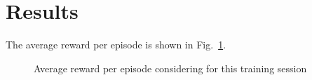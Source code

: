 \documentclass{IEEEtran}
\begin{document}
\section{Results}
The average reward per episode is shown in Fig.~\ref{fig:results}.
\begin{figure}[t!]
    \resizebox{\columnwidth}{!}{}
    \caption{Average reward per episode considering for this training session}\label{fig:results}
\end{figure}
\end{document}
